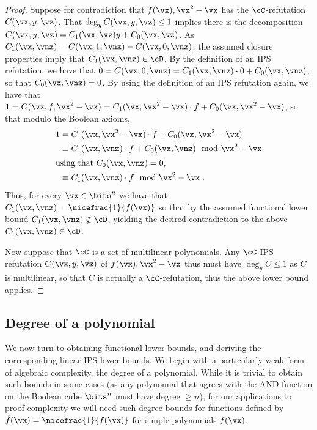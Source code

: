 \documentclass[11pt]{article}
\numberwithin{equation}{section}
\theoremstyle{definition}
\theoremstyle{plain}
\begin{document}
\begin{proof}
        Suppose for contradiction that $f(\vx),\vx^2-\vx$ has the $\cC$-\lbIPS refutation $C(\vx,y,\vz)$.  That $\deg_{y} C(\vx,y,\vz)\le 1$ implies there is the decomposition $C(\vx,y,\vz)=C_1(\vx,\vz)y+C_0(\vx,\vz)$.  As $C_1(\vx,\vnz)=C(\vx,1,\vnz)-C(\vx,0,\vnz)$, the assumed closure properties imply that $C_1(\vx,\vnz)\in\cD$. By the definition of an IPS refutation, we have that $0=C(\vx,0,\vnz)=C_1(\vx,\vnz)\cdot 0+C_0(\vx,\vnz)$, so that $C_0(\vx,\vnz)=0$. By using the definition of an IPS refutation again, we have that $1=C(\vx,f,\vx^2-\vx)=C_1(\vx,\vx^2-\vx)\cdot f+C_0(\vx,\vx^2-\vx)$, so that modulo the Boolean axioms,
        \begin{align*}
                1&=\textstyle C_1(\vx,\vx^2-\vx)\cdot f+C_0(\vx,\vx^2-\vx) \\
                &\equiv \textstyle C_1(\vx,\vnz)\cdot f+C_0(\vx,\vnz) \mod \vx^2-\vx\\
                \intertext{using that $C_0(\vx,\vnz)=0$,}
                &\equiv \textstyle C_1(\vx,\vnz)\cdot f \mod \vx^2-\vx
                \;.
        \end{align*}
        Thus, for every $\vx\in\bits^n$ we have that $C_1(\vx,\vnz)=\nicefrac{1}{f(\vx)}$ so that by the assumed functional lower bound $C_1(\vx,\vnz)\notin \cD$, yielding the desired contradiction to the above $C_1(\vx,\vnz)\in\cD$.

        Now suppose that $\cC$ is a set of multilinear polynomials.  Any $\cC$-IPS refutation $C(\vx,y,\vz)$ of $f(\vx),\vx^2-\vx$ thus must have $\deg_y C\le 1$ as $C$ is multilinear, so that $C$ is actually a $\cC$-\lbIPS refutation, thus the above lower bound applies.
\end{proof}

\subsection{Degree of a polynomial}\label{sec:lbs-fn:deg}

We now turn to obtaining functional lower bounds, and deriving the corresponding linear-IPS lower bounds. We begin with a particularly weak form of algebraic complexity, the degree of a polynomial.  While it is trivial to obtain such bounds in some cases (as any polynomial that agrees with the AND function on the Boolean cube $\bits^n$ must have degree $\ge n$), for our applications to proof complexity we will need such degree bounds for functions defined by $\hat{f}(\vx)=\nicefrac{1}{f(\vx)}$ for simple polynomials $f(\vx)$.
\end{document}
